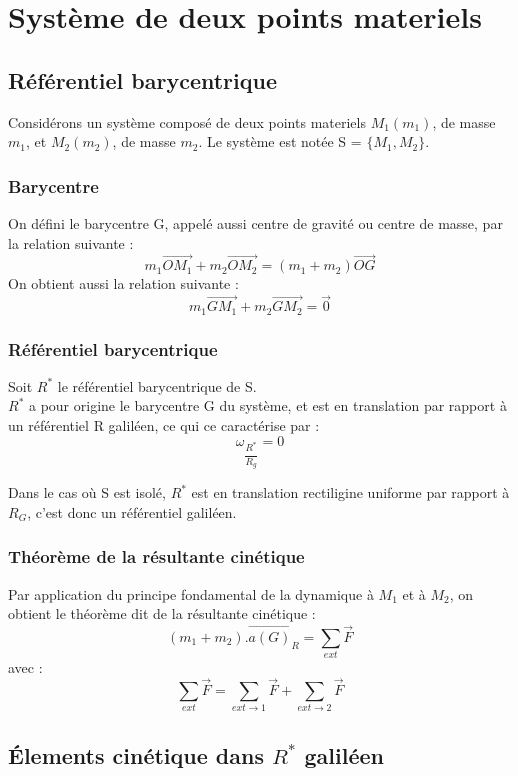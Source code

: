 \chapter{Système de deux points materiels}
\section{Référentiel barycentrique}
Considérons un système composé de deux points materiels $M_1(m_1)$, de masse $m_1$, et $M_2(m_2)$, de masse $m_2$. Le système est notée S = $\{M_1,M_2\}$.\\
\subsection{Barycentre}
\begin{de}
On défini le barycentre G, appelé aussi centre de gravité ou centre de masse, par la relation suivante :
$$m_1\overrightarrow{OM_1} + m_2\overrightarrow{OM_2} = (m_1+m_2) \overrightarrow{OG}$$
On obtient aussi la relation suivante : 
$$m_1\overrightarrow{GM_1} + m_2\overrightarrow{GM_2} = \overrightarrow{0}$$
\end{de}
\subsection{Référentiel barycentrique}
\begin{de}
Soit $R^*$ le référentiel barycentrique de S.\\
$R^*$ a pour origine le barycentre G du système, et est en translation par rapport à un référentiel R galiléen, ce qui ce caractérise par : 
$$\omega_{\dfrac{R^*}{R_g}} = 0$$
\end{de}
\begin{prop}
Dans le cas où S est isolé, $R^*$ est en translation rectiligine uniforme par rapport à $R_G$, c'est donc un référentiel galiléen.
\end{prop}
\subsection{Théorème de la résultante cinétique}
Par application du principe fondamental de la dynamique à $M_1$ et à $M_2$, on obtient le théorème dit de la résultante cinétique :
$$(m_1+m_2).\overrightarrow{a(G)}_R = \sum_{ext} \overrightarrow{F}$$ 
avec : 
$$\sum_{ext} \overrightarrow{F} = \sum_{ext \rightarrow 1} \overrightarrow{F} + \sum_{ext \rightarrow 2} \overrightarrow{F}$$
\section{Élements cinétique dans $R^*$ galiléen}
